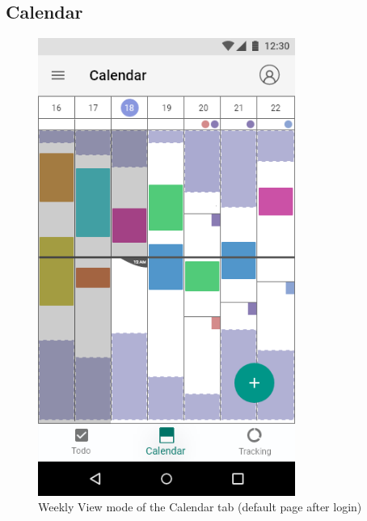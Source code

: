 \documentclass[a4paper,11pt]{article} %
\begin{document}
\subsection{Calendar}
\begin{figure}[h!]
  \centering
  \includegraphics[width=0.75\textwidth]{img/ui-wireframe/Calendar.png}
  \caption{Weekly View mode of the Calendar tab (default page after login)}
\end{figure}
\newpage
\end{document}
